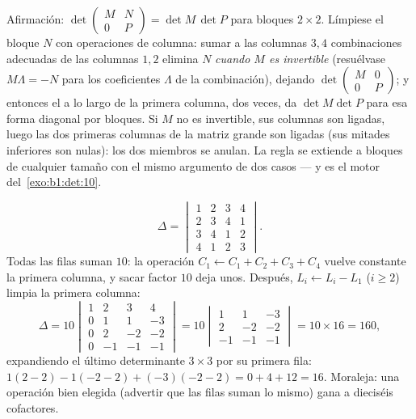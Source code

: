 \begin{example}
\label{ex:b1:det:blocktriangular}
Afirmación:
$\det\begin{pmatrix} M & N\\ 0 & P\end{pmatrix} = \det M\,\det P$
para bloques $2\times2$. Límpiese el bloque $N$ con operaciones de
columna: sumar a las columnas $3, 4$ combinaciones adecuadas de las
columnas $1, 2$ elimina $N$ \emph{cuando $M$ es invertible}
(resuélvase $M\Lambda = -N$ para los coeficientes $\Lambda$ de la
combinación), dejando
$\det\begin{pmatrix} M & 0\\ 0 & P\end{pmatrix}$; y entonces el
 a lo largo de la primera columna, dos
veces, da $\det M\det P$ para esa forma diagonal por bloques. Si $M$
no es invertible, sus columnas son ligadas, luego las dos primeras
columnas de la matriz grande son ligadas (sus mitades inferiores son
nulas): los dos miembros se anulan. La regla se extiende a bloques de
cualquier tamaño con el mismo argumento de dos casos --- y es el
motor del~\cref{exo:b1:det:10}.
\end{example}

\begin{example}
\label{ex:b1:det:fourbyfour}
\[
\Delta = \begin{vmatrix}
1 & 2 & 3 & 4\\
2 & 3 & 4 & 1\\
3 & 4 & 1 & 2\\
4 & 1 & 2 & 3
\end{vmatrix}.
\]
Todas las filas suman $10$: la operación
$C_1 \leftarrow C_1 + C_2 + C_3 + C_4$ vuelve constante la primera
columna, y sacar factor $10$ deja unos. Después,
$L_i \leftarrow L_i - L_1$ ($i \geq 2$) limpia la primera columna:
\[
\Delta = 10\begin{vmatrix}
1 & 2 & 3 & 4\\
0 & 1 & 1 & -3\\
0 & 2 & -2 & -2\\
0 & -1 & -1 & -1
\end{vmatrix}
= 10\begin{vmatrix}
1 & 1 & -3\\
2 & -2 & -2\\
-1 & -1 & -1
\end{vmatrix}
= 10 \times 16 = 160,
\]
expandiendo el último determinante $3\times3$ por su primera fila:
$1(2 - 2) - 1(-2 - 2) + (-3)(-2 - 2) = 0 + 4 + 12 = 16$. Moraleja:
una operación bien elegida (advertir que las filas suman lo mismo)
gana a dieciséis cofactores.
\end{example}

